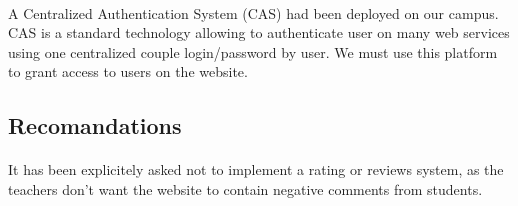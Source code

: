 \paragraph{} A Centralized Authentication System (CAS) had been deployed on our
campus. CAS is a standard technology allowing to authenticate user on many
web services using one centralized couple login/password by user. We must use
this platform to grant access to users on the website.

\subsection{Recomandations}

\paragraph{} It has been explicitely asked not to implement a rating or reviews
system, as the teachers don't want the website to contain negative comments from
students.

